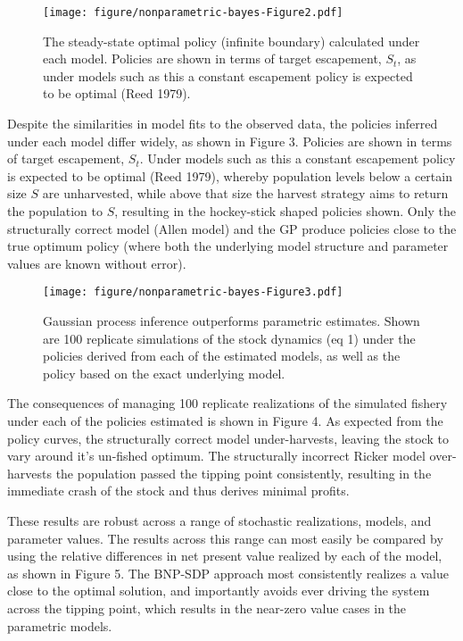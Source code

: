 \documentclass[author-year, review]{elsarticle} %
\makeatletter
\def\maxwidth{\ifdim\Gin@nat@width>\linewidth\linewidth
\else\Gin@nat@width\fi}
\let\Oldincludegraphics\includegraphics
\renewcommand{\includegraphics}[1]{\Oldincludegraphics[width=\maxwidth]{#1}}
\makeatother
\begin{document}
\begin{figure}[htbp]
\centering
\texttt{[image: figure/nonparametric-bayes-Figure2.pdf]}
\caption{The steady-state optimal policy (infinite boundary) calculated
under each model. Policies are shown in terms of target escapement,
$S_t$, as under models such as this a constant escapement policy is
expected to be optimal (Reed 1979).}
\end{figure}

Despite the similarities in model fits to the observed data, the
policies inferred under each model differ widely, as shown in Figure 3.
Policies are shown in terms of target escapement, $S_t$. Under models
such as this a constant escapement policy is expected to be optimal
(Reed 1979), whereby population levels below a certain size $S$ are
unharvested, while above that size the harvest strategy aims to return
the population to $S$, resulting in the hockey-stick shaped policies
shown. Only the structurally correct model (Allen model) and the GP
produce policies close to the true optimum policy (where both the
underlying model structure and parameter values are known without
error).

\begin{figure}[htbp]
\centering
\texttt{[image: figure/nonparametric-bayes-Figure3.pdf]}
\caption{Gaussian process inference outperforms parametric estimates.
Shown are 100 replicate simulations of the stock dynamics (eq 1) under
the policies derived from each of the estimated models, as well as the
policy based on the exact underlying model.}
\end{figure}

The consequences of managing 100 replicate realizations of the simulated
fishery under each of the policies estimated is shown in Figure 4. As
expected from the policy curves, the structurally correct model
under-harvests, leaving the stock to vary around it's un-fished optimum.
The structurally incorrect Ricker model over-harvests the population
passed the tipping point consistently, resulting in the immediate crash
of the stock and thus derives minimal profits.

These results are robust across a range of stochastic realizations,
models, and parameter values. The results across this range can most
easily be compared by using the relative differences in net present
value realized by each of the model, as shown in Figure 5. The BNP-SDP
approach most consistently realizes a value close to the optimal
solution, and importantly avoids ever driving the system across the
tipping point, which results in the near-zero value cases in the
parametric models.
\end{document}
